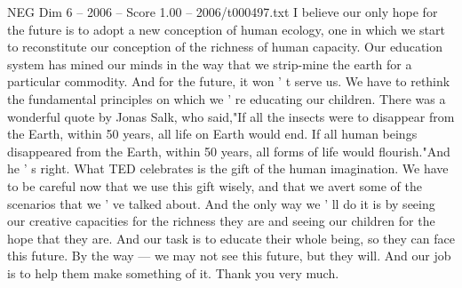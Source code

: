\begin{textsample}{NEG Dim 6 – 2006 – Score 1.00 – 2006/t000497.txt}
I believe our only hope for the future is to adopt a new conception of human ecology, one in which we start to reconstitute our conception of the richness of human capacity.
Our education system has mined our minds in the way that we strip-mine the earth for a particular commodity.
And for the future, it won ' t serve us.
We have to rethink the fundamental principles on which we ' re educating our children.
There was a wonderful quote by Jonas Salk, who said,"If all the insects were to disappear from the Earth, within 50 years, all life on Earth would end.
If all human beings disappeared from the Earth, within 50 years, all forms of life would flourish."And he ' s right.
What TED celebrates is the gift of the human imagination.
We have to be careful now that we use this gift wisely, and that we avert some of the scenarios that we ' ve talked about.
And the only way we ' ll do it is by seeing our creative capacities for the richness they are and seeing our children for the hope that they are.
And our task is to educate their whole being, so they can face this future.
By the way — we may not see this future, but they will.
And our job is to help them make something of it.
Thank you very much.

\end{textsample}
